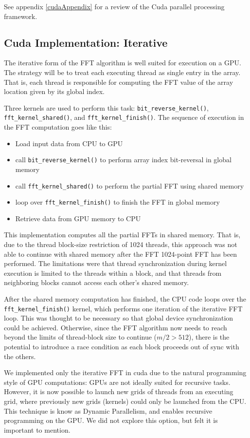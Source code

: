See appendix \ref{cudaAppendix} for a review of the Cuda parallel processing framework.
\subsection{Cuda Implementation: Iterative}
The iterative form of the FFT algorithm is well suited for execution on a GPU. The strategy will be to treat each executing thread as single entry in the array. That is, each thread is responsible for computing the FFT value of the array location given by its global index. 

Three kernels are used to perform this task: \texttt{bit\_reverse\_kernel()}, \texttt{fft\_kernel\_shared()}, and \texttt{fft\_kernel\_finish()}. The sequence of execution in the FFT computation goes like this:
\begin{itemize}
    \item Load input data from CPU to GPU
    \item call \texttt{bit\_reverse\_kernel()} to perform array index bit-reversal in global memory
    \item call \texttt{fft\_kernel\_shared()} to perform the partial FFT using shared memory
    \item loop over \texttt{fft\_kernel\_finish()} to finish the FFT in global memory
    \item Retrieve data from GPU memory to CPU
\end{itemize}

This implementation computes all the partial FFTs in shared memory. That is, due to the thread block-size restriction of 1024 threads, this approach was not able to continue with shared memory after the FFT 1024-point FFT has been performed. The limitations were that thread synchronization during kernel execution is limited to the threads within a block, and that threads from neighboring blocks cannot access each other's shared memory.

After the shared memory computation has finished, the CPU code loops over the \texttt{fft\_kernel\_finish()} kernel, which performs one iteration of the iterative FFT loop. This was thought to be necessary so that global device synchronization could be achieved. Otherwise, since the FFT algorithm now needs to reach beyond the limits of thread-block size to continue ($m/2 > 512$), there is the potential to introduce a race condition as each block proceeds out of sync with the others. 

We implemented only the iterative FFT in cuda due to the natural programming style of GPU computations: GPUs are not ideally suited for recursive tasks. However, it is now possible to launch new grids of threads from an executing grid, where previously new grids (kernels) could only be launched from the CPU. This technique is know as Dynamic Parallelism, and enables recursive programming on the GPU. We did not explore this option, but felt it is important to mention.

